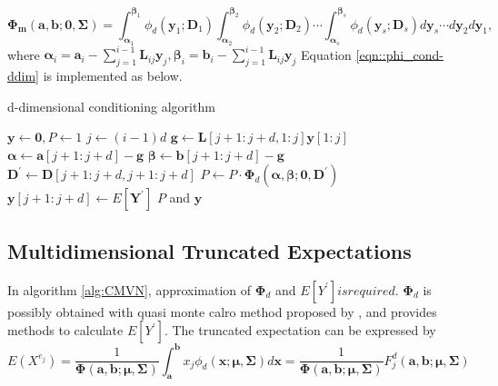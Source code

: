 \begin{equation}\label{eqn::phi_cond-ddim}
	\boldsymbol{\Phi_m}(\mathbf{a},\mathbf{b};\mathbf{0},\boldsymbol{\Sigma})=\int_{\mathbf{\alpha}_1}^{\mathbf{\beta}_1}\phi_d(\mathbf{y}_1;\mathbf{D}_1)\int_{\mathbf{\alpha}_2}^{\mathbf{\beta}_2}\phi_d(\mathbf{y}_2;\mathbf{D}_2)\cdots\int_{\mathbf{\alpha}_s}^{\mathbf{\beta}_s}\phi_d(\mathbf{y}_s;\mathbf{D}_s)d\mathbf{y}_s\cdots d\mathbf{y}_2d\mathbf{y}_1,
\end{equation}
where $\boldsymbol{\alpha}_i=\mathbf{a}_i-\sum_{j=1}^{i-1}\mathbf{L}_{ij}\mathbf{y}_j, \boldsymbol{\beta}_i=\mathbf{b}_i-\sum_{j=1}^{i-1}\mathbf{L}_{ij}\mathbf{y}_j$
Equation \eqref{eqn::phi_cond-ddim} is implemented as below.

\begin{algorithm}[ht]
	\caption{d-dimensional conditioning algorithm}
	\begin{algorithmic}[1]
		\State $\mathbf{y}\leftarrow\mathbf{0},P\leftarrow1$
		\State $j\leftarrow(i-1)d$
		\State $\mathbf{g}\leftarrow\mathbf{L}[j+1:j+d,1:j]\mathbf{y}[1:j]$
		\State $\boldsymbol{\alpha}\leftarrow\mathbf{a}[j+1:j+d]-\mathbf{g}$
		\State $\boldsymbol{\beta}\leftarrow\mathbf{b}[j+1:j+d]-\mathbf{g}$
		\State $\mathbf{D}^\prime\leftarrow\mathbf{D}[j+1:j+d,j+1:j+d]$
		\State $P\leftarrow P\cdot\boldsymbol{\Phi}_d(\boldsymbol{\alpha},\boldsymbol{\beta};\mathbf{0},\mathbf{D}^\prime)$
		\State $\mathbf{y}[j+1:j+d]\leftarrow E[\mathbf{Y}^\prime]$
		\EndFor
		\State\Return $P$ and $\mathbf{y}$
		\EndProcedure
	\end{algorithmic}\label{alg:CMVN}
\end{algorithm}

\subsection{Multidimensional Truncated Expectations}
In algorithm \ref{alg:CMVN}, approximation of $\boldsymbol{\Phi}_d$ and $E[Y^\prime] is required$. $\boldsymbol{\Phi}_d$ is possibly obtained with quasi monte calro method proposed by \citet{genz1992numerical}, and \citet{kan2017moments} provides methods to calculate $E[Y^\prime]$. The truncated expectation can be expressed by
$$E(X^{e_j})=\frac{1}{\boldsymbol{\Phi}(\mathbf{a},\mathbf{b};\boldsymbol{\mu},\boldsymbol{\Sigma})}\int_\mathbf{a}^\mathbf{b}x_j\phi_d(\mathbf{x};\boldsymbol{\mu},\boldsymbol{\Sigma})d\mathbf{x}=\frac{1}{\boldsymbol{\Phi}(\mathbf{a},\mathbf{b};\boldsymbol{\mu},\boldsymbol{\Sigma})}F_j^d(\mathbf{a},\mathbf{b};\boldsymbol{\mu},\boldsymbol{\Sigma})$$

